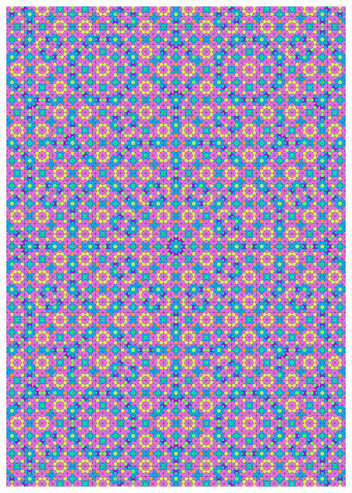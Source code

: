 \documentclass[text.tex]{subfiles}
\begin{document}
\begin{figure}[h!]
\centering
\includegraphics[width=1\textwidth]{img/results/octagon/quasi_polygon-octagon_185355_(5_1alpha_4).pdf}
\end{figure}
\end{document}
